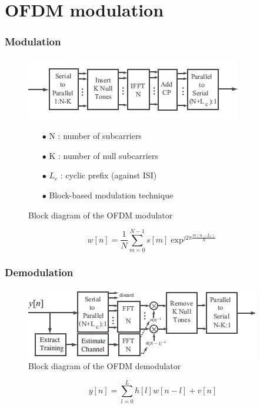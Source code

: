 \documentclass[11pt]{beamer}
\begin{document}
\section{OFDM modulation}
\begin{frame}
\frametitle{Modulation}

\begin{figure}[!ht]
    \begin{minipage}[b]{0.48\linewidth}
        \centering \includegraphics[scale=0.6]{img/OFDDM_modulator.png}
     \caption{Block diagram of the OFDM modulator}
     \label{fig2}
    \end{minipage}\hfill
    \begin{minipage}[b]{0.48\linewidth}  
    \centering  
    \begin{itemize}
    \item[$\bullet$] N : number of subcarriers
    \item[$\bullet$] K : number of null subcarriers
    \item[$\bullet$] $L_c$ : cyclic prefix (against ISI)
    \item[$\bullet$] Block-based modulation technique
    \end{itemize}
        
    \end{minipage}
\end{figure}
\begin{equation}
w[n]=\frac{1}{N} \sum_{m=0}^{N-1} s[m]\exp^{j2\pi\frac{m(n-L_c)}{N}}
\end{equation}
\end{frame}

\begin{frame}
\frametitle{Demodulation}
\begin{figure}[!ht]
         \centering \includegraphics[scale=0.75]{img/OFDDM_demodulator.png}
 \caption{Block diagram of the OFDM demodulator}\label{fig3}  
\end{figure}
\begin{equation}  
 y[n]=\sum_{l=0}^{L} h[l]w[n-l]+v[n]
 \end{equation}
\end{frame}
\end{document}
